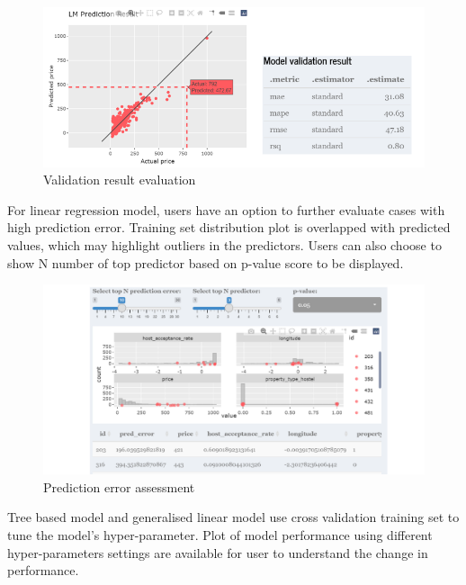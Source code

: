 \documentclass{acm_proc_article-sp}
\begin{document}
\begin{figure}[H]

{\centering \includegraphics[width=1\linewidth]{images/mdleval} 

}

\caption{Validation result evaluation}\label{fig:unnamed-chunk-13}
\end{figure}

For linear regression model, users have an option to further evaluate
cases with high prediction error. Training set distribution plot is
overlapped with predicted values, which may highlight outliers in the
predictors. Users can also choose to show N number of top predictor
based on p-value score to be displayed.

\begin{figure}[H]

{\centering \includegraphics[width=1\linewidth]{images/prederror} 

}

\caption{Prediction error assessment}\label{fig:unnamed-chunk-14}
\end{figure}

Tree based model and generalised linear model use cross validation
training set to tune the model's hyper-parameter. Plot of model
performance using different hyper-parameters settings are available for
user to understand the change in performance.
\end{document}
